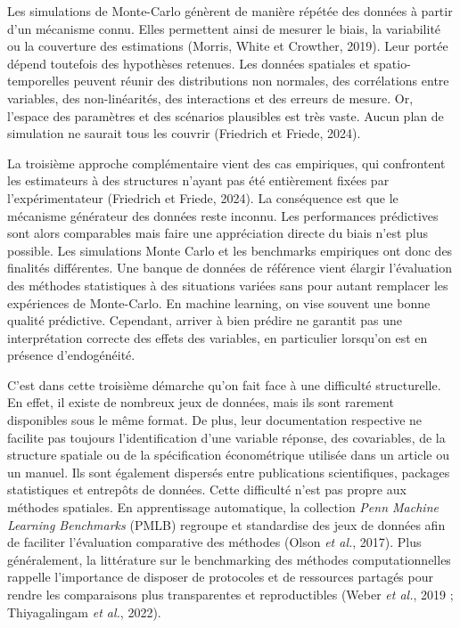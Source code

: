 \documentclass[11pt,a4paper]{article}
\begin{document}
Les simulations de Monte-Carlo génèrent de manière répétée des données à partir d'un mécanisme connu. Elles permettent ainsi de mesurer le biais, la variabilité ou la couverture des estimations (Morris, White et Crowther, 2019). Leur portée dépend toutefois des hypothèses retenues. Les données spatiales et spatio-temporelles peuvent réunir des distributions non normales, des corrélations entre variables, des non-linéarités, des interactions et des erreurs de mesure. Or, l'espace des paramètres et des scénarios plausibles est très vaste. Aucun plan de simulation ne saurait tous les couvrir (Friedrich et Friede, 2024).

La troisième approche complémentaire vient des cas empiriques, qui confrontent les estimateurs à des structures n'ayant pas été entièrement fixées par l'expérimentateur (Friedrich et Friede, 2024). La conséquence est que le mécanisme générateur des données reste inconnu. Les performances prédictives sont alors comparables mais faire une appréciation directe du biais n'est plus possible. Les simulations Monte Carlo et les benchmarks empiriques ont donc des finalités différentes. Une banque de données de référence vient élargir l'évaluation des méthodes statistiques à des situations variées sans pour autant remplacer les expériences de Monte-Carlo. En machine learning, on vise souvent une bonne qualité prédictive. Cependant, arriver à bien prédire ne garantit pas une interprétation correcte des effets des variables, en particulier lorsqu'on est en présence d'endogénéité.


C'est dans cette troisième démarche qu'on fait face à une difficulté structurelle. En effet, il existe de nombreux jeux de données, mais ils sont rarement disponibles sous le même format. De plus, leur documentation respective ne facilite pas toujours l'identification d'une variable réponse, des covariables, de la structure spatiale ou de la spécification économétrique utilisée dans un article ou un manuel. Ils sont également dispersés entre publications scientifiques, packages statistiques et entrepôts de données. Cette difficulté n'est pas propre aux méthodes spatiales. En apprentissage automatique, la collection \textit{Penn Machine Learning Benchmarks} (PMLB) regroupe et standardise des jeux de données afin de faciliter l'évaluation comparative des méthodes (Olson \textit{et al.}, 2017). Plus généralement, la littérature sur le benchmarking des méthodes computationnelles rappelle l'importance de disposer de protocoles et de ressources partagés pour rendre les comparaisons plus transparentes et reproductibles (Weber \textit{et al.}, 2019 ; Thiyagalingam \textit{et al.}, 2022).
\end{document}
